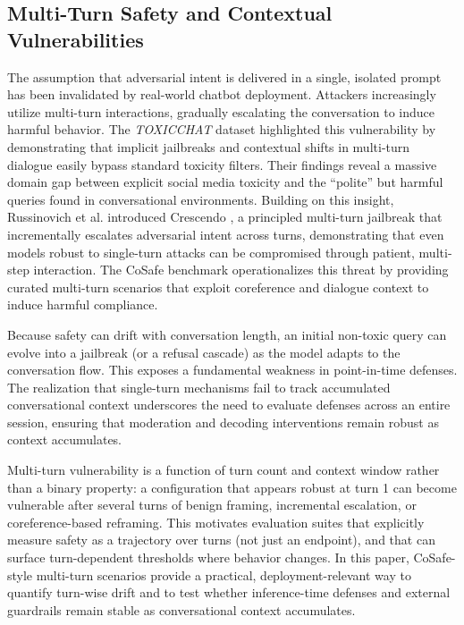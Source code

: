 \documentclass[10pt, twocolumn]{article}
\begin{document}
\subsection{Multi-Turn Safety and Contextual Vulnerabilities}
The assumption that adversarial intent is delivered in a single, isolated prompt has been invalidated by real-world chatbot deployment. Attackers increasingly utilize multi-turn interactions, gradually escalating the conversation to induce harmful behavior. The \textit{TOXICCHAT} dataset \cite{lin2023toxicchat} highlighted this vulnerability by demonstrating that implicit jailbreaks and contextual shifts in multi-turn dialogue easily bypass standard toxicity filters. Their findings reveal a massive domain gap between explicit social media toxicity and the ``polite'' but harmful queries found in conversational environments. Building on this insight, Russinovich et al. introduced Crescendo \cite{russinovich2024crescendo}, a principled multi-turn jailbreak that incrementally escalates adversarial intent across turns, demonstrating that even models robust to single-turn attacks can be compromised through patient, multi-step interaction. The CoSafe benchmark \cite{yu2024cosafe} operationalizes this threat by providing curated multi-turn scenarios that exploit coreference and dialogue context to induce harmful compliance.

Because safety can drift with conversation length, an initial non-toxic query can evolve into a jailbreak (or a refusal cascade) as the model adapts to the conversation flow. This exposes a fundamental weakness in point-in-time defenses. The realization that single-turn mechanisms fail to track accumulated conversational context underscores the need to evaluate defenses across an entire session, ensuring that moderation and decoding interventions remain robust as context accumulates.

Multi-turn vulnerability is a function of turn count and context window rather than a binary property: a configuration that appears robust at turn 1 can become vulnerable after several turns of benign framing, incremental escalation, or coreference-based reframing. This motivates evaluation suites that explicitly measure safety as a trajectory over turns (not just an endpoint), and that can surface turn-dependent thresholds where behavior changes. In this paper, CoSafe-style multi-turn scenarios provide a practical, deployment-relevant way to quantify turn-wise drift and to test whether inference-time defenses and external guardrails remain stable as conversational context accumulates.
\end{document}
